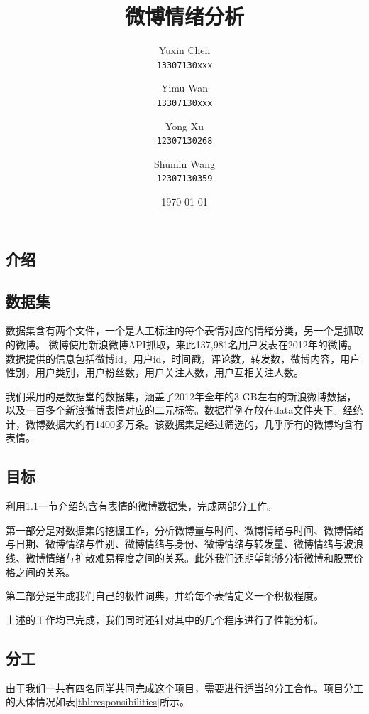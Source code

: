 \documentclass[12pt, oneside]{article}
\title{微博情绪分析}
\author{
	Yuxin Chen\\
	\texttt{13307130xxx}
	\and
	Yimu Wan\\
	\texttt{13307130xxx}
	\and
	Yong Xu\\
	\texttt{12307130268}
	\and
	Shumin Wang\\
	\texttt{12307130359}
}
\date{\today}
\begin{document}
\begin{spacing}{1.5}
\begin{CJK}{UTF8}{gbsn}

\maketitle

\tableofcontents

\newpage

\section{介绍}
\subsection{数据集}
\label{subsec:dataset}
数据集含有两个文件，一个是人工标注的每个表情对应的情绪分类，另一个是抓取的微博。
微博使用新浪微博API抓取，来此137,981名用户发表在2012年的微博。数据提供的信息包括微博id，用户id，时间戳，评论数，转发数，微博内容，用户性别，用户类别，用户粉丝数，用户关注人数，用户互相关注人数。

我们采用的是数据堂的数据集，涵盖了2012年全年的3 GB左右的新浪微博数据，以及一百多个新浪微博表情对应的二元标签。数据样例存放在data文件夹下。经统计，微博数据大约有1400多万条。该数据集是经过筛选的，几乎所有的微博均含有表情。

\subsection{目标}
利用\ref{subsec:dataset}一节介绍的含有表情的微博数据集，完成两部分工作。

第一部分是对数据集的挖掘工作，分析微博量与时间、微博情绪与时间、微博情绪与日期、微博情绪与性别、微博情绪与身份、微博情绪与转发量、微博情绪与波浪线、微博情绪与扩散难易程度之间的关系。此外我们还期望能够分析微博和股票价格之间的关系。

第二部分是生成我们自己的极性词典，并给每个表情定义一个积极程度。

上述的工作均已完成，我们同时还针对其中的几个程序进行了性能分析。

\subsection{分工}

由于我们一共有四名同学共同完成这个项目，需要进行适当的分工合作。项目分工的大体情况如表\ref{tbl:responsibilities}所示。


\end{CJK}
\end{spacing}
\end{document}
